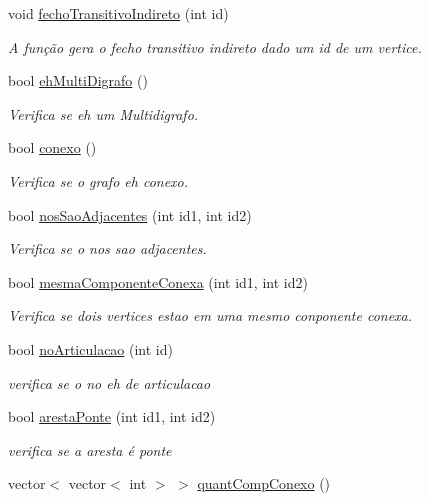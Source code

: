\begin{DoxyCompactItemize}
void \hyperlink{class_grafo_a568fd7e7ef01a0bb6e85b44999f519cd}{fecho\-Transitivo\-Indireto} (int id)
\begin{DoxyCompactList}\small\item\em A função gera o fecho transitivo indireto dado um id de um vertice. \end{DoxyCompactList}\item 
bool \hyperlink{class_grafo_adf78302a0ba04265275889cecd67be01}{eh\-Multi\-Digrafo} ()
\begin{DoxyCompactList}\small\item\em Verifica se eh um Multidigrafo. \end{DoxyCompactList}\item 
bool \hyperlink{class_grafo_a50fe04d01b2d34b777d8df0b827bedab}{conexo} ()
\begin{DoxyCompactList}\small\item\em Verifica se o grafo eh conexo. \end{DoxyCompactList}\item 
bool \hyperlink{class_grafo_a184ed3a4401ad77ff33a47da71d15e24}{nos\-Sao\-Adjacentes} (int id1, int id2)
\begin{DoxyCompactList}\small\item\em Verifica se o nos sao adjacentes. \end{DoxyCompactList}\item 
bool \hyperlink{class_grafo_af095a9c01a8762f358a2c7fced700975}{mesma\-Componente\-Conexa} (int id1, int id2)
\begin{DoxyCompactList}\small\item\em Verifica se dois vertices estao em uma mesmo conponente conexa. \end{DoxyCompactList}\item 
bool \hyperlink{class_grafo_af5c44085a44be2520c52775efc87380f}{no\-Articulacao} (int id)
\begin{DoxyCompactList}\small\item\em verifica se o no eh de articulacao \end{DoxyCompactList}\item 
bool \hyperlink{class_grafo_ad5ae61b6d0ae27569dd58b519b359927}{aresta\-Ponte} (int id1, int id2)
\begin{DoxyCompactList}\small\item\em verifica se a aresta é ponte \end{DoxyCompactList}\item 
vector$<$ vector$<$ int $>$ $>$ \hyperlink{class_grafo_a42f883ece5986fcf8cbc4a8c793844f5}{quant\-Comp\-Conexo} ()

\end{DoxyCompactItemize}
